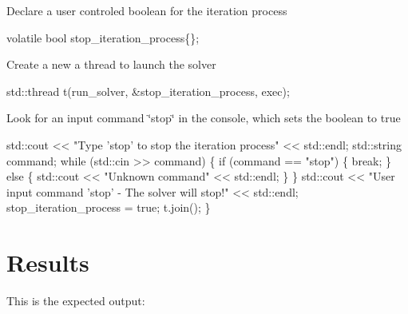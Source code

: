 Declare a user controled boolean for the iteration process


\begin{DoxyCode}
\textcolor{keyword}{volatile} \textcolor{keywordtype}{bool} stop\_iteration\_process\{\};
\end{DoxyCode}


Create a new a thread to launch the solver


\begin{DoxyCode}
std::thread t(run\_solver, &stop\_iteration\_process, exec);
\end{DoxyCode}


Look for an input command \char`\"{}stop\char`\"{} in the console, which sets the boolean to true


\begin{DoxyCode}
    std::cout << \textcolor{stringliteral}{"Type 'stop' to stop the iteration process"} << std::endl;
    std::string command;
    \textcolor{keywordflow}{while} (std::cin >> command) \{
        \textcolor{keywordflow}{if} (command == \textcolor{stringliteral}{"stop"}) \{
            \textcolor{keywordflow}{break};
        \} \textcolor{keywordflow}{else} \{
            std::cout << \textcolor{stringliteral}{"Unknown command"} << std::endl;
        \}
    \}
    std::cout << \textcolor{stringliteral}{"User input command 'stop' - The solver will stop!"}
              << std::endl;
    stop\_iteration\_process = \textcolor{keyword}{true};
    t.join();
\}
\end{DoxyCode}
 \label{_Results}%
\section*{Results}

This is the expected output\+:


